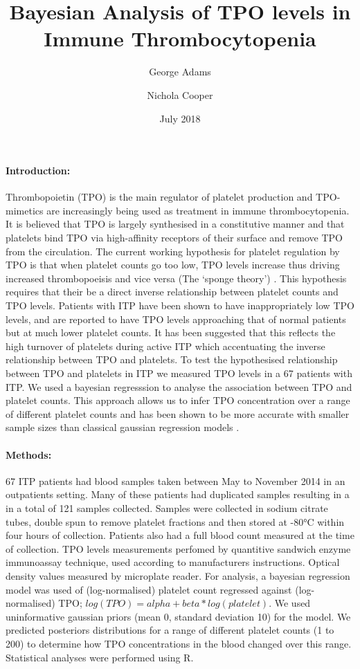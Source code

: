 \documentclass[11pt]{article}
\title{Bayesian Analysis of TPO levels in Immune Thrombocytopenia}
\author[1,2]{\small George Adams}
\author[1,2]{\small Nichola Cooper}
\affil[1]{\footnotesize Imperial College London, Kensington, London SW7 2AZ}
\affil[2]{\footnotesize Hammersmith Hospital, Imperial College NHS Trust, London W12 0HS}
\date{July 2018}
\begin{document}
\maketitle

\paragraph{Introduction:} Thrombopoietin (TPO) is the main regulator of platelet production and TPO-mimetics are increasingly being used as treatment in immune thrombocytopenia. It is believed that TPO is largely synthesised in a constitutive manner and that platelets bind TPO via high-affinity receptors of their surface and remove TPO from the circulation. The current working hypothesis for platelet regulation by TPO is that when platelet counts go too low, TPO levels increase thus driving increased thrombopoeisis and vice versa (The `sponge theory') \cite{EtoLinkagemechanismsthrombocytopenia2016}. This hypothesis requires that their be a direct inverse relationship between platelet counts and TPO levels. Patients with ITP have been shown to have inappropriately low TPO levels, and are reported to have TPO levels approaching that of normal patients but at much lower platelet counts. It has been suggested that this reflects the high turnover of platelets during active ITP which accentuating the inverse relationship between TPO and platelets. To test the hypothesised relationship between TPO and platelets in ITP we measured TPO levels in a 67 patients with ITP. We used a bayesian regresssion to analyse the association between TPO and platelet counts. This approach allows us to infer TPO concentration over a range of different platelet counts and has been shown to be more accurate with smaller sample sizes than classical gaussian regression models \cite{GoldsteinBayesiananalysisregression1976}.


\paragraph{Methods:} 67 ITP patients had blood samples taken between May to November 2014 in an outpatients setting. Many of these patients had duplicated samples resulting in a in a total of 121 samples collected. Samples were collected in sodium citrate tubes, double spun to remove platelet fractions and then stored at -80°C within four hours of collection. Patients also had a full blood count measured at the time of collection. TPO levels measurements perfomed by quantitive sandwich enzyme immunoassay technique, used according to manufacturers instructions. Optical density values measured by microplate reader. For analysis, a bayesian regression model was used of (log-normalised) platelet count regressed against (log-normalised) TPO; $log(TPO) = alpha + beta*log(platelet)$. We used uninformative gaussian priors (mean 0, standard deviation 10) for the model. We predicted posteriors distributions for a range of different platelet counts (1 to 200) to determine how TPO concentrations in the blood changed over this range. Statistical analyses were performed using R.
\end{document}
